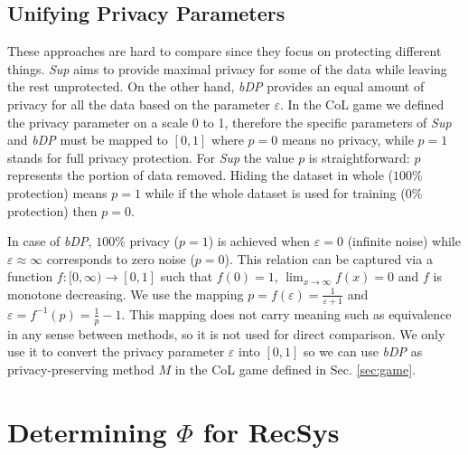 \documentclass[USenglish,oneside,twocolumn]{article}
\theoremstyle{plain}
\newtheorem{definition}{Definition}
\begin{document}
    
    \vspace{-0.5cm}
    \subsection{Unifying Privacy Parameters}
    \label{sec:pripar}
    \vspace{-0.25cm}
    
    These approaches are hard to compare since they focus on protecting different things. \textit{Sup} aims to provide maximal privacy for some of the data while leaving the rest unprotected. On the other hand, \textit{bDP} provides an equal amount of privacy for all the data based on the parameter $\varepsilon$. In the CoL game we defined the privacy parameter on a scale 0 to 1, therefore the specific parameters of \textit{Sup} and \textit{bDP} must be mapped to $[0,1]$ where $p=0$ means no privacy, while $p=1$ stands for full privacy protection. For \textit{Sup} the value $p$ is straightforward: $p$ represents the portion of data removed. Hiding the dataset in whole ($100\%$ protection) means $p=1$ while if the whole dataset is used for training ($0\%$ protection) then $p=0$.
    
    In case of \textit{bDP}, $100\%$ privacy ($p=1$) is achieved when $\varepsilon=0$ (infinite noise) while $\varepsilon\approx\infty$ corresponds to zero noise ($p=0$). This relation can be captured via a function $f:[0,\infty)\rightarrow[0,1]$ such that $f(0)=1$, $\lim_{x\rightarrow\infty}f(x)=0$ and $f$ is monotone decreasing. We use the mapping $p=f(\varepsilon)=\frac{1}{\varepsilon+1}$ and $\varepsilon=f^{-1}(p)=\frac1p-1$. This mapping does not carry meaning such as equivalence in any sense between methods, so it is not used for direct comparison. We only use it to convert the privacy parameter $\varepsilon$ into $[0,1]$ so we can use \textit{bDP} as privacy-preserving method $M$ in the CoL game defined in Sec. \ref{sec:game}.
    

    \vspace{-0.5cm}
    \section{Determining $\Phi$ for RecSys}
    \label{sec:exp}
    \vspace{-0.25cm}
    
\end{document}
